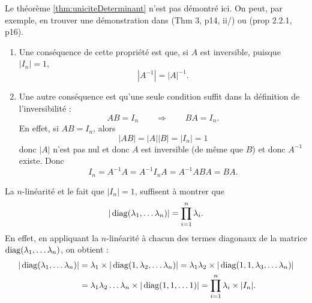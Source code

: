 Le théorème \ref{thm:uniciteDeterminant} n'est pas démontré ici. On peut, par exemple, en trouver une démonstration dans \cite{GAJ94} (Thm 3, p14, ii/) ou \cite{Ser01} (prop 2.2.1, p16).
\eproof

\remarks 
\begin{enumerate}
  \item Une conséquence de cette propriété est que, si $A$ est inversible, puisque $|I_n| = 1$,
  $$
  |A^{-1}| = |A|^{-1}.
  $$
  \item Une autre conséquence est qu'une seule condition suffit dans la définition de l'inversibilité : 
  $$
  AB = I_n \qquad \Rightarrow \qquad BA = I_n.
  $$
  En effet, si $AB = I_n$, alors
  $$
  |AB| = |A| |B| = |I_n| = 1
  $$
  donc $|A|$ n'est pas nul et donc $A$ est inversible (de même que $B$) et donc $A^{-1}$ existe. Donc
  $$
  I_n = A^{-1} A = A^{-1} I_n A = A^{-1} A B A = B A.
  $$
\end{enumerate}

\remark
La $n$-linéarité et le fait que $|I_n| = 1$, suffisent à montrer que 
\begin{equation} \label{eq:determiantMatriceDiagonale}
|\operatorname{diag}(\lambda_1, \dots \lambda_n)| = \prod_{i = 1}^n \lambda_i.
\end{equation}
En effet, en appliquant la $n$-linéarité à chacun des termes diagonaux de la matrice $\operatorname{diag}(\lambda_1, \dots \lambda_n)$, on obtient : 
\begin{align*}
|\operatorname{diag}(\lambda_1, \dots \lambda_n)| 
& = \lambda_1 \times |\operatorname{diag}(1, \lambda_2, \dots \lambda_n)|
= \lambda_1 \lambda_2 \times |\operatorname{diag}(1, 1, \lambda_3, \dots \lambda_n)| \\
& = \lambda_1 \lambda_2 \dots \lambda_n \times |\operatorname{diag}(1, 1, \dots 1)|
= \prod_{i=1}^n \lambda_i \times |I_n|.
\end{align*}

